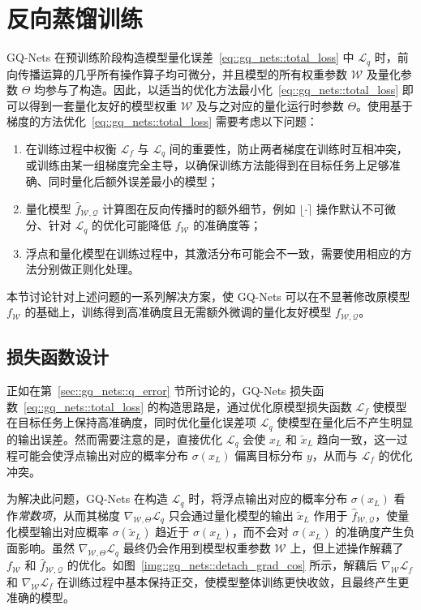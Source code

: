 \section{反向蒸馏训练} \label{sec::gq_nets::train}
GQ-Nets 在预训练阶段构造模型量化误差~\eqref{eq::gq_nets::total_loss} 中 $\mathcal{L}_q$ 时，前向传播运算的几乎所有操作算子均可微分，并且模型的所有权重参数 $\mathcal{W}$ 及量化参数 $\Theta$ 均参与了构造。因此，以适当的优化方法最小化~\eqref{eq::gq_nets::total_loss} 即可以得到一套量化友好的模型权重 $\mathcal{W}$ 及与之对应的量化运行时参数 $\Theta$。使用基于梯度的方法优化~\eqref{eq::gq_nets::total_loss} 需要考虑以下问题：
\begin{enumerate}[1)]
  \item 在训练过程中权衡 $\mathcal{L}_f$ 与 $\mathcal{L}_q$ 间的重要性，防止两者梯度在训练时互相冲突，或训练由某一组梯度完全主导，以确保训练方法能得到在目标任务上足够准确、同时量化后额外误差最小的模型；
  \item 量化模型 $\hat{f}_{\mathcal{W, Q}}$ 计算图在反向传播时的额外细节，例如 $\lfloor\cdot\rceil$ 操作默认不可微分、针对 $\mathcal{L}_q$ 的优化可能降低 $f_{\mathcal{W}}$ 的准确度等；
  \item 浮点和量化模型在训练过程中，其激活分布可能会不一致，需要使用相应的方法分别做正则化处理。
\end{enumerate}
本节讨论针对上述问题的一系列解决方案，使 GQ-Nets 可以在不显著修改原模型 $f_{\mathcal{W}}$ 的基础上，训练得到高准确度且无需额外微调的量化友好模型 $f_{\mathcal{W, Q}}$。
\subsection{损失函数设计} \label{sec::gq_nets::loss_func}
正如在第~\ref{sec::gq_nets::q_error} 节所讨论的，GQ-Nets 损失函数~\eqref{eq::gq_nets::total_loss} 的构造思路是，通过优化原模型损失函数 $\mathcal{L}_f$ 使模型在目标任务上保持高准确度，同时优化量化误差项 $\mathcal{L}_q$ 使模型在量化后不产生明显的输出误差。然而需要注意的是，直接优化 $\mathcal{L}_q$ 会使 $x_L$ 和 $\tilde{x}_L$ 趋向一致，这一过程可能会使浮点输出对应的概率分布 $\sigma(x_L)$ 偏离目标分布 $y$，从而与 $\mathcal{L}_f$ 的优化冲突。

为解决此问题，GQ-Nets 在构造 $\mathcal{L}_q$ 时，将浮点输出对应的概率分布 $\sigma(x_L)$ 看作\emph{常数项}，从而其梯度 $\nabla_{\mathcal{W}, \Theta} \mathcal{L}_q$ 只会通过量化模型的输出 $\tilde{x}_L$ 作用于 $\hat{f}_{\mathcal{W, Q}}$，使量化模型输出对应概率 $\sigma(\tilde{x}_L)$ 趋近于 $\sigma(x_L)$，而不会对 $\sigma(x_L)$ 的准确度产生负面影响。虽然 $\nabla_{\mathcal{W}, \Theta} \mathcal{L}_q$ 最终仍会作用到模型权重参数 $\mathcal{W}$ 上，但上述操作解藕了 $f_{\mathcal{W}}$ 和 $\hat{f}_{\mathcal{W, Q}}$ 的优化。如图~\ref{img::gq_nets::detach_grad_cos} 所示，解藕后 $\nabla_{\mathcal{W}} \mathcal{L}_f$ 和 $\nabla_{\mathcal{W}} \mathcal{L}_f$ 在训练过程中基本保持正交，使模型整体训练更快收敛，且最终产生更准确的模型。

